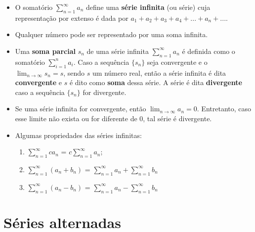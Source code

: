 		\begin{itemize}
			
			\item O somatório $\sum_{n = 1}^{\infty} a_{n}$ define uma \textbf{série infinita} (ou série) cuja representação por extenso é dada por $a_{1} + a_{2} + a_{3} + a_{4} + ... + a_{n} + ...$.
			
			\item Qualquer número pode ser representado por uma soma infinita.
			
			\item Uma \textbf{soma parcial} $s_{n}$ de uma série infinita $\sum_{n = 1}^{\infty} a_{n}$ é definida como o somatório $\sum_{i=1}^{n} a_{i}$. Caso a sequência $\{s_{n}\}$ seja convergente e o $\lim_{n\rightarrow  \infty} s_{n} = s$, sendo $s$ um número real, então a série infinita é dita \textbf{convergente} e $s$ é dito como \textbf{soma} dessa série. A série é dita \textbf{divergente} caso a sequência $\{s_{n}\}$ for divergente.
			
			\item Se uma série infinita for convergente, então $\lim_{n\rightarrow  \infty} a_{n} = 0$. Entretanto, caso esse limite não exista ou for diferente de 0, tal série é divergente.
			
			\item Algumas propriedades das séries infinitas:
			
			\begin{enumerate}
				\item $\sum_{n=1}^{\infty} ca_{n}$ = $c\sum_{n=1}^{\infty} a_{n}$;
				
				\item $\sum_{n=1}^{\infty} (a_{n} + b_{n})$ = $\sum_{n=1}^{\infty} a_{n} + \sum_{n=1}^{\infty} b_{n}$
				
				\item $\sum_{n=1}^{\infty} (a_{n} - b_{n})$ = $\sum_{n=1}^{\infty} a_{n} - \sum_{n=1}^{\infty} b_{n}$
			\end{enumerate}
			
		\end{itemize}
	
	\section{Séries alternadas}
	
